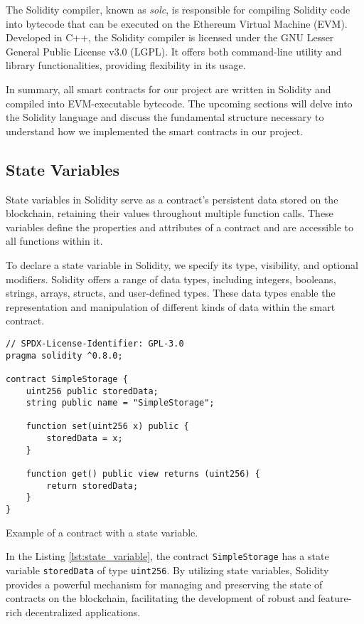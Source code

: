 The Solidity compiler, known as \textit{solc}, is responsible for compiling Solidity code into bytecode that can be executed on the Ethereum Virtual Machine (EVM). 
Developed in C++, the Solidity compiler is licensed under the GNU Lesser General Public License v3.0 (LGPL). It offers both command-line utility and library 
functionalities, providing flexibility in its usage.

In summary, all smart contracts for our project are written in Solidity and compiled into EVM-executable bytecode. The upcoming sections will delve into the Solidity 
language and discuss the fundamental structure necessary to understand how we implemented the smart contracts in our project.



\subsection{State Variables}

State variables in Solidity serve as a contract's persistent data stored on the blockchain, retaining their values throughout multiple function calls. These 
variables define the properties and attributes of a contract and are accessible to all functions within it.

To declare a state variable in Solidity, we specify its type, visibility, and optional modifiers. Solidity offers a range of data types, including integers, booleans, 
strings, arrays, structs, and user-defined types. These data types enable the representation and manipulation of different kinds of data within the smart contract.

\begin{listing}[!ht]
    \begin{verbatim}
// SPDX-License-Identifier: GPL-3.0
pragma solidity ^0.8.0;

contract SimpleStorage {
    uint256 public storedData;
    string public name = "SimpleStorage";

    function set(uint256 x) public {
        storedData = x;
    }

    function get() public view returns (uint256) {
        return storedData;
    }
}
    \end{verbatim}
    \caption{Example of a contract with a state variable.}
    \label{lst:state_variable}
\end{listing}

In the Listing \ref{lst:state_variable}, the contract \texttt{SimpleStorage} has a state variable \texttt{storedData} of type \texttt{uint256}.
By utilizing state variables, Solidity provides a powerful mechanism for managing and preserving the state of contracts on the blockchain, facilitating the development of 
robust and feature-rich decentralized applications.


